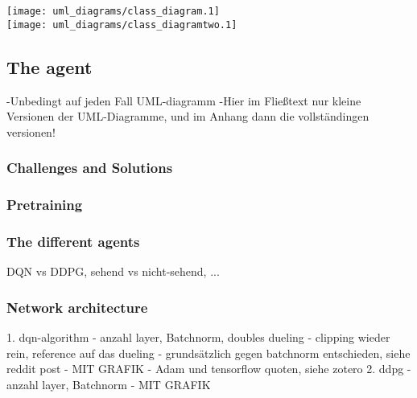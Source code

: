 
\texttt{[image: uml\_diagrams/class\_diagram.1]}\\
\newpage
\texttt{[image: uml\_diagrams/class\_diagramtwo.1]}  






\subsection{The agent}

-Unbedingt auf jeden Fall UML-diagramm
-Hier im Fließtext nur kleine Versionen der UML-Diagramme, und im Anhang dann die vollständingen versionen!

\subsubsection{Challenges and Solutions}



\subsubsection{Pretraining}

\subsubsection{The different agents}

DQN vs DDPG, sehend vs nicht-sehend, ...  

\subsubsection{Network architecture}

1. dqn-algorithm
- anzahl layer, Batchnorm, doubles dueling
- clipping wieder rein, reference auf das dueling
- grundsätzlich gegen batchnorm entschieden, siehe reddit post
- MIT GRAFIK
- Adam und tensorflow quoten, siehe zotero
2. ddpg
- anzahl layer, Batchnorm
- MIT GRAFIK


